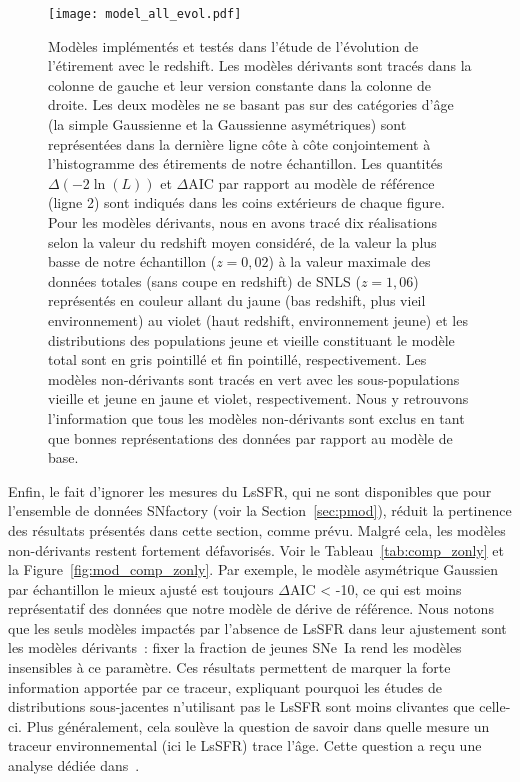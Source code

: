 \documentclass[../main/main.tex]{subfiles}
\begin{document}
\begin{figure}[p]
    \vspace*{-3cm}
    \centerfloat
    \texttt{[image: model\_all\_evol.pdf]}
    \caption[Modèles implémentés et testés dans l'étude de l'évolution de
    l'étirement avec le redshift]{\scriptsize Modèles implémentés et testés dans
        l'étude de l'évolution de l'étirement avec le redshift. Les modèles
        dérivants sont tracés dans la colonne de gauche et leur version
        constante dans la colonne de droite. Les deux modèles ne se basant pas
        sur des catégories d'âge (la simple Gaussienne et la Gaussienne
        asymétriques) sont représentées dans la dernière ligne côte à côte
        conjointement à l'histogramme des étirements de notre échantillon. Les
        quantités $\Delta(-2\ln(L))$ et $\Delta$AIC par rapport au modèle de
        référence (ligne 2) sont indiqués dans les coins extérieurs de chaque
        figure. Pour les modèles dérivants, nous en avons tracé dix réalisations
        selon la valeur du redshift moyen considéré, de la valeur la plus basse
        de notre échantillon ($z = 0,02$) à la valeur maximale des données
        totales (sans coupe en redshift) de SNLS ($z = 1,06$) représentés en
        couleur allant du jaune (bas redshift, plus vieil environnement) au
        violet (haut redshift, environnement jeune) et les distributions des
        populations jeune et vieille constituant le modèle total sont en gris
        pointillé et fin pointillé, respectivement. Les modèles non-dérivants
        sont tracés en vert avec les sous-populations vieille et jeune en jaune
        et violet, respectivement. Nous y retrouvons l'information que tous les
        modèles non-dérivants sont exclus en tant que bonnes représentations des
    données par rapport au modèle de base.}
    \label{fig:mod_all}
\end{figure}

Enfin, le fait d'ignorer les mesures du LsSFR, qui ne sont disponibles que pour
l'ensemble de données SNfactory (voir la Section~\ref{sec:pmod}), réduit la
pertinence des résultats présentés dans cette section, comme prévu. Malgré cela,
les modèles non-dérivants restent fortement défavorisés. Voir le
Tableau~\ref{tab:comp_zonly} et la Figure~\ref{fig:mod_comp_zonly}. Par exemple,
le modèle asymétrique Gaussien par échantillon le mieux ajusté est toujours
$\Delta$AIC < -10, ce qui est moins représentatif des données que notre modèle
de dérive de référence. Nous notons que les seuls modèles impactés par l'absence de
LsSFR dans leur ajustement sont les modèles dérivants~: fixer la fraction de
jeunes SNe~Ia rend les modèles insensibles à ce paramètre. Ces résultats
permettent de marquer la forte information apportée par ce traceur, expliquant
pourquoi les études de distributions sous-jacentes n'utilisant pas le LsSFR sont
moins clivantes que celle-ci. Plus généralement, cela soulève la question de
savoir dans quelle mesure un traceur environnemental (ici le LsSFR) trace l'âge.
Cette question a reçu une analyse dédiée dans~\cite{briday2022}.
\end{document}

